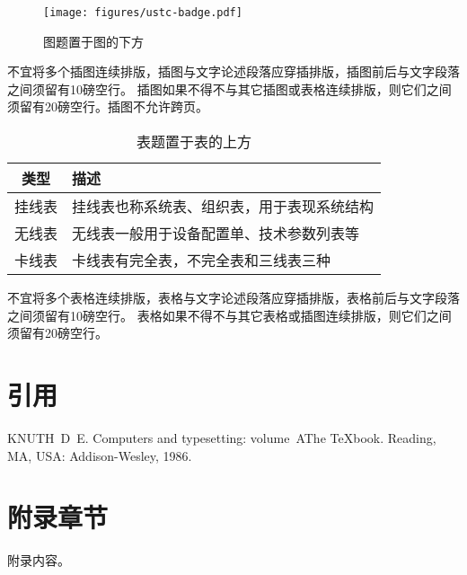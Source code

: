 \begin{figure}[h]
  \centering
  \texttt{[image: figures/ustc-badge.pdf]}
  \caption{图题置于图的下方}
  \label{fig:badge}
\end{figure}

不宜将多个插图连续排版，插图与文字论述段落应穿插排版，插图前后与文字段落之间须留有10磅空行。
插图如果不得不与其它插图或表格连续排版，则它们之间须留有20磅空行。插图不允许跨页。

\begin{table}[h]
  \centering
  \caption{表题置于表的上方}
  \label{tab:exampletable}
  \begin{tabular}{cl}
    \toprule
    类型   & 描述                                       \\
    \midrule
    挂线表 & 挂线表也称系统表、组织表，用于表现系统结构 \\
    无线表 & 无线表一般用于设备配置单、技术参数列表等   \\
    卡线表 & 卡线表有完全表，不完全表和三线表三种       \\
    \bottomrule
  \end{tabular}
\end{table}

不宜将多个表格连续排版，表格与文字论述段落应穿插排版，表格前后与文字段落之间须留有10磅空行。
表格如果不得不与其它表格或插图连续排版，则它们之间须留有20磅空行。

\chapter{引用}
\cite{knuth86a}

\backmatter
\begin{thebibliography}{1}
KNUTH~D~E.
\newblock Computers and typesetting: volume~A\quad The
  {\TeX}book\allowbreak[M].
\newblock Reading, MA, USA: Addison-Wesley, 1986.
\end{thebibliography}

\appendix
\chapter{附录章节}
附录内容。

